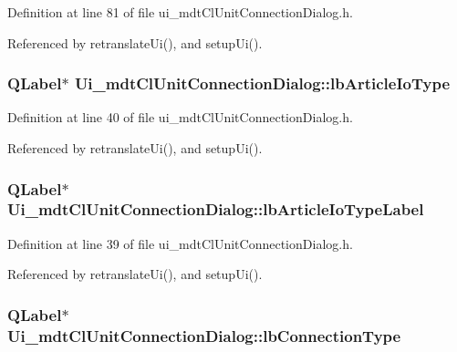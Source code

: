 Definition at line 81 of file ui\-\_\-mdt\-Cl\-Unit\-Connection\-Dialog.\-h.



Referenced by retranslate\-Ui(), and setup\-Ui().

\hypertarget{class_ui__mdt_cl_unit_connection_dialog_a87fe908cb5fef02efed381f5f4ddb42a}{
\subsubsection[{lb\-Article\-Io\-Type}]{\setlength{\rightskip}{0pt plus 5cm}Q\-Label$\ast$ Ui\-\_\-mdt\-Cl\-Unit\-Connection\-Dialog\-::lb\-Article\-Io\-Type}}\label{class_ui__mdt_cl_unit_connection_dialog_a87fe908cb5fef02efed381f5f4ddb42a}


Definition at line 40 of file ui\-\_\-mdt\-Cl\-Unit\-Connection\-Dialog.\-h.



Referenced by retranslate\-Ui(), and setup\-Ui().

\hypertarget{class_ui__mdt_cl_unit_connection_dialog_ad6fb4a3140d3e5e0307b6e19384c8cac}{
\subsubsection[{lb\-Article\-Io\-Type\-Label}]{\setlength{\rightskip}{0pt plus 5cm}Q\-Label$\ast$ Ui\-\_\-mdt\-Cl\-Unit\-Connection\-Dialog\-::lb\-Article\-Io\-Type\-Label}}\label{class_ui__mdt_cl_unit_connection_dialog_ad6fb4a3140d3e5e0307b6e19384c8cac}


Definition at line 39 of file ui\-\_\-mdt\-Cl\-Unit\-Connection\-Dialog.\-h.



Referenced by retranslate\-Ui(), and setup\-Ui().

\hypertarget{class_ui__mdt_cl_unit_connection_dialog_a8b3061a8270e195d9781fbc20061c04d}{
\subsubsection[{lb\-Connection\-Type}]{\setlength{\rightskip}{0pt plus 5cm}Q\-Label$\ast$ Ui\-\_\-mdt\-Cl\-Unit\-Connection\-Dialog\-::lb\-Connection\-Type}}\label{class_ui__mdt_cl_unit_connection_dialog_a8b3061a8270e195d9781fbc20061c04d}


